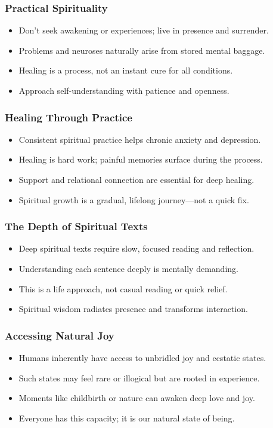 \begin{frame}[fragile]\frametitle{Practical Spirituality}
  \begin{itemize}
    \item Don’t seek awakening or experiences; live in presence and surrender.
    \item Problems and neuroses naturally arise from stored mental baggage.
    \item Healing is a process, not an instant cure for all conditions.
    \item Approach self-understanding with patience and openness.
  \end{itemize}
\end{frame}

\begin{frame}[fragile]\frametitle{Healing Through Practice}
  \begin{itemize}
    \item Consistent spiritual practice helps chronic anxiety and depression.
    \item Healing is hard work; painful memories surface during the process.
    \item Support and relational connection are essential for deep healing.
    \item Spiritual growth is a gradual, lifelong journey—not a quick fix.
  \end{itemize}
\end{frame}

\begin{frame}[fragile]\frametitle{The Depth of Spiritual Texts}
  \begin{itemize}
    \item Deep spiritual texts require slow, focused reading and reflection.
    \item Understanding each sentence deeply is mentally demanding.
    \item This is a life approach, not casual reading or quick relief.
    \item Spiritual wisdom radiates presence and transforms interaction.
  \end{itemize}
\end{frame}

\begin{frame}[fragile]\frametitle{Accessing Natural Joy}
  \begin{itemize}
    \item Humans inherently have access to unbridled joy and ecstatic states.
    \item Such states may feel rare or illogical but are rooted in experience.
    \item Moments like childbirth or nature can awaken deep love and joy.
    \item Everyone has this capacity; it is our natural state of being.
  \end{itemize}
\end{frame}

